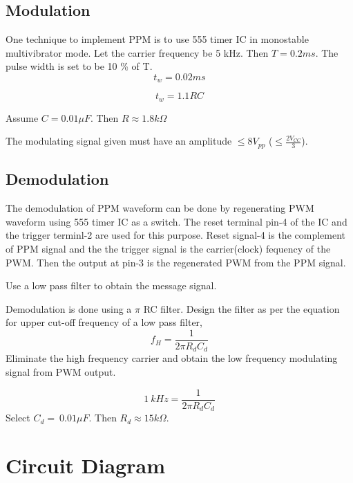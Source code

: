 \subsection*{Modulation}

One technique to implement PPM is to use 555 timer IC in monostable multivibrator mode. Let the carrier frequency be 5 kHz. Then $T= 0.2 ms$. The pulse width is set to be 10 \% of T.
\begin{equation}
t_w=0.02 ms
\end{equation}

\begin{equation}
t_w = 1.1 R C
\end{equation}



Assume $C=0.01 \mu F$. Then  $R\approx  1.8k\Omega $ 

The modulating signal given must have an amplitude $\le 8 V_{pp}$ ($\le \frac{2V_{CC}}{3}$).

\subsection*{Demodulation}
The demodulation of PPM waveform can be done by regenerating PWM waveform using 555 timer IC as a switch.  The reset terminal pin-4 of the IC and the trigger terminl-2 are used for this purpose. Reset signal-4 is the complement of PPM signal and the the trigger signal is the carrier(clock) fequency of the PWM. Then the output at pin-3 is the regenerated PWM from the PPM signal. 

Use a low pass filter to obtain the message signal.

Demodulation is done using a  $\pi$ RC filter.
\noindent Design the filter as per the equation for upper cut-off frequency of a low pass filter,
\begin{equation}
f_H=\frac{1}{2\pi R_dC_d}
\end{equation}
\noindent Eliminate the high frequency carrier and obtain the low frequency modulating signal from PWM output.

\begin{equation}
1\ kHz=\frac{1}{2\pi R_dC_d}
\end{equation}
\noindent Select $C_d=\ 0.01 \mu F$. Then $R_d \approx 15k\Omega$.

\section*{Circuit Diagram}

